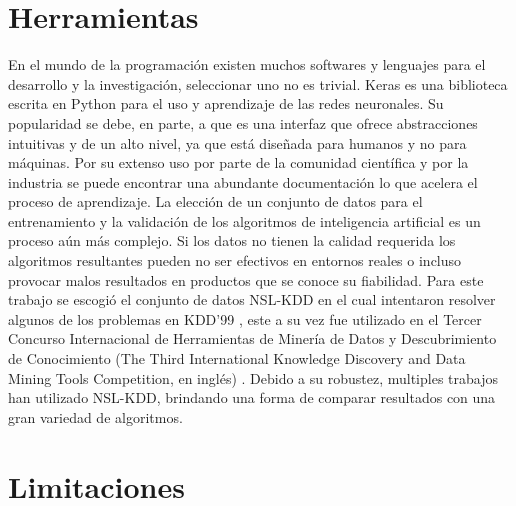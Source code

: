 \section*{Herramientas}
En el mundo de la programación existen muchos softwares y lenguajes para el desarrollo y la investigación, seleccionar uno no es trivial. Keras \cite{gulli2017deep} es una biblioteca escrita en Python \cite{lutz2001programming} para el uso y aprendizaje de las redes neuronales. Su popularidad se debe, en parte, a que es una interfaz que ofrece abstracciones intuitivas y de un alto nivel, ya que está diseñada para humanos y no para máquinas. Por su extenso uso por parte de la comunidad científica y por la industria se puede encontrar una abundante documentación lo que acelera el proceso de aprendizaje. La elección de un conjunto de datos para el entrenamiento y la validación de los algoritmos de inteligencia artificial es un proceso aún más complejo. Si los datos no tienen la calidad requerida los algoritmos resultantes pueden no ser efectivos en entornos reales o incluso provocar malos resultados en productos que se conoce su fiabilidad. Para este trabajo se escogió el conjunto de datos NSL-KDD \cite{dhanabal2015study} en el cual intentaron resolver algunos de los problemas en KDD'99 \cite{tavallaee2009detailed}, este a su vez fue utilizado en el Tercer Concurso Internacional de Herramientas de Minería de Datos y Descubrimiento de Conocimiento (The Third International Knowledge Discovery and Data Mining Tools Competition, en inglés) \cite{stolfocost}. Debido a su robustez, multiples trabajos han utilizado NSL-KDD, brindando una forma de comparar resultados con una gran variedad de algoritmos.

\section*{Limitaciones}

